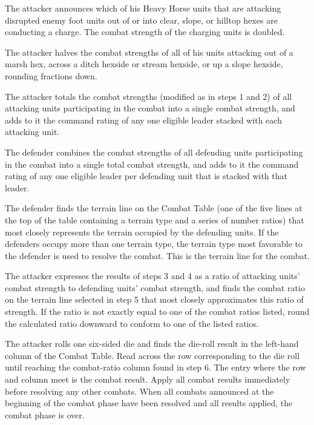\begin{steps}
  \item The attacker announces which of his Heavy Horse units that are attacking disrupted enemy foot units out of or into clear, slope, or hilltop hexes are conducting a charge. The combat strength of the charging units is doubled.
  \item The attacker halves the combat strengths of all of his units attacking out of a marsh hex, across a ditch hexside or stream hexside, or up a slope hexside, rounding fractions down.
  \item The attacker totals the combat strengths (modified as in steps 1 and 2) of all attacking units participating in the combat into a single combat strength, and adds to it the command rating of any one eligible leader stacked with each attacking unit.
  \item The defender combines the combat strengths of all defending units participating in the combat into a single total combat strength, and adds to it the command rating of any one eligible leader per defending unit that is stacked with that leader.
  \item The defender finds the terrain line on the Combat Table (one of the five lines at the top of the table containing a terrain type and a series of number ratios) that most closely represents the terrain occupied by the defending units. If the defenders occupy more than one terrain type, the terrain type most favorable to the defender is used to resolve the combat. This is the terrain line for the combat.
  \item The attacker expresses the results of steps 3 and 4 as a ratio of attacking units' combat strength to defending units' combat strength, and finds the combat ratio on the terrain line selected in step 5 that most closely approximates this ratio of strength. If the ratio is not exactly equal to one of the combat ratios listed, round the calculated ratio downward to conform to one of the listed ratios.
  \item The attacker rolls one six-sided die and finds the die-roll result in the left-hand column of the Combat Table. Read across the row corresponding to the die roll until reaching the combat-ratio column found in step 6. The entry where the row and column meet is the combat result. Apply all combat results immediately before resolving any other combats. When all combats announced at the beginning of the combat phase have been resolved and all results applied, the combat phase is over.
\end{steps}

